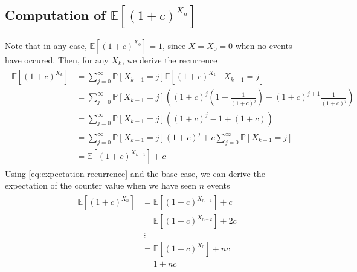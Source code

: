 \documentclass[9pt]{article}
\newcommand{\Probability}[1]{\mathbb{P}\left[ #1 \right]}
\newcommand{\Expectation}[1]{\mathbb{E}\left[ #1 \right]}
\begin{document}
\subsection*{\textbf{Computation of} $\Expectation{(1 + c)^{X_{n}}}$}
Note that in any case, $\Expectation{(1 + c)^{X_{0}}} = 1$, since $X = X_{0} = 0$ when
no events have occured. Then, for any $X_{k}$, we derive the recurrence
\begin{align}
    \label{eq:expectation-recurrence}
    \begin{split}
        \Expectation{(1 + c)^{X_{k}}}
        &= \sum_{j = 0}^{\infty} \Probability{X_{k-1} = j} \Expectation{(1 + c)^{X_{k}} \mid X_{k-1} = j} \\
        &= \sum_{j = 0}^{\infty} \Probability{X_{k-1} = j} \left( (1 + c)^{j}
        \left( 1 - \frac{1}{(1 + c)^{j}} \right) + (1 + c)^{j+1} \frac{1}{(1 + c)^{j}} \right) \\
        &= \sum_{j = 0}^{\infty} \Probability{X_{k-1} = j} \left( (1 + c)^{j} - 1 + (1 + c) \right) \\
        &= \sum_{j = 0}^{\infty} \Probability{X_{k-1} = j} (1 + c)^{j} + c \sum_{j = 0}^{\infty} \Probability{X_{k-1} = j} \\
        &= \Expectation{(1 + c)^{X_{k-1}}} + c
    \end{split}
\end{align}
Using \eqref{eq:expectation-recurrence} and the base case, we can derive the expectation
of the counter value when we have seen $n$ events
\begin{align}
    \begin{split}
        \Expectation{(1 + c)^{X_{n}}}
        &= \Expectation{(1 + c)^{X_{n-1}}} + c \\
        &= \Expectation{(1 + c)^{X_{n-2}}} + 2c \\
        &\ \vdots \\
        &= \Expectation{(1 + c)^{X_{0}}} + nc \\
        &= 1 + nc
    \end{split}
\end{align}
\end{document}
